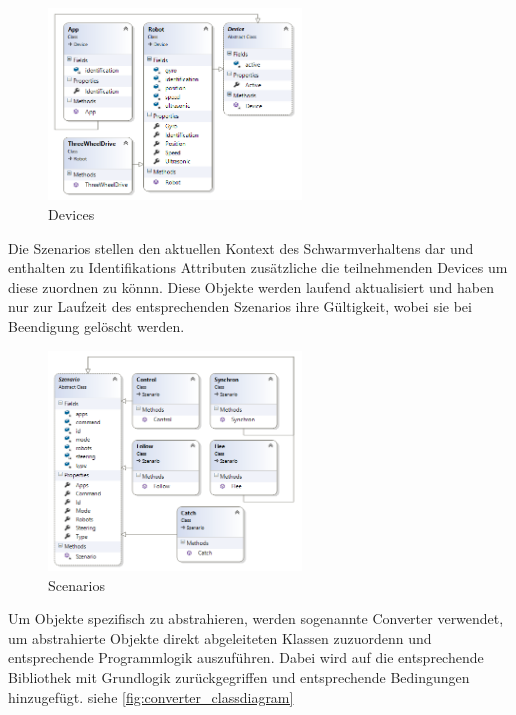 \begin{figure}[h]
	\begin{center}
		\includegraphics[width=0.6\textwidth]{images/uml/devices.png}
	\end{center}
	\caption{Devices}
	\label{fig:devices_classdiagram}
\end{figure}

\newpage
Die Szenarios stellen den aktuellen Kontext des Schwarmverhaltens dar und enthalten zu Identifikations Attributen zusätzliche die teilnehmenden Devices um diese zuordnen zu könnn. Diese Objekte werden laufend aktualisiert und haben nur zur Laufzeit des entsprechenden Szenarios ihre Gültigkeit, wobei sie bei Beendigung gelöscht werden.

\begin{figure}[h]
	\begin{center}
		\includegraphics[width=0.6\textwidth]{images/uml/szenarios.png}
	\end{center}
	\caption{Scenarios}
	\label{fig:szenarios_classdiagram}
\end{figure}

\newpage
Um Objekte spezifisch zu abstrahieren, werden sogenannte Converter verwendet, um abstrahierte Objekte direkt abgeleiteten Klassen zuzuordenn und entsprechende Programmlogik auszuführen. Dabei wird auf die entsprechende Bibliothek mit Grundlogik zurückgegriffen und entsprechende Bedingungen hinzugefügt. siehe \ref{fig:converter_classdiagram}

